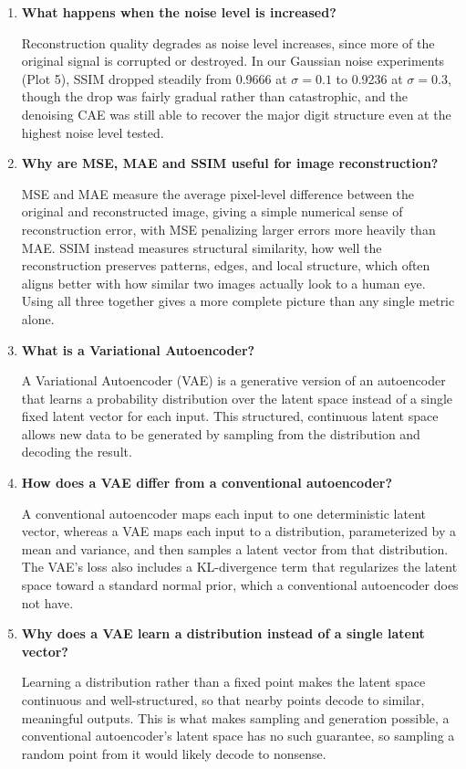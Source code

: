 \documentclass[10pt]{article}
\begin{document}
\begin{enumerate}
\item \textbf{What happens when the noise level is increased?}

Reconstruction quality degrades as noise level increases, since more of the original signal is corrupted or destroyed. In our Gaussian noise experiments (Plot 5), SSIM dropped steadily from 0.9666 at $\sigma=0.1$ to 0.9236 at $\sigma=0.3$, though the drop was fairly gradual rather than catastrophic, and the denoising CAE was still able to recover the major digit structure even at the highest noise level tested.

\item \textbf{Why are MSE, MAE and SSIM useful for image reconstruction?}

MSE and MAE measure the average pixel-level difference between the original and reconstructed image, giving a simple numerical sense of reconstruction error, with MSE penalizing larger errors more heavily than MAE. SSIM instead measures structural similarity, how well the reconstruction preserves patterns, edges, and local structure, which often aligns better with how similar two images actually look to a human eye. Using all three together gives a more complete picture than any single metric alone.

\item \textbf{What is a Variational Autoencoder?}

A Variational Autoencoder (VAE) is a generative version of an autoencoder that learns a probability distribution over the latent space instead of a single fixed latent vector for each input. This structured, continuous latent space allows new data to be generated by sampling from the distribution and decoding the result.

\item \textbf{How does a VAE differ from a conventional autoencoder?}

A conventional autoencoder maps each input to one deterministic latent vector, whereas a VAE maps each input to a distribution, parameterized by a mean and variance, and then samples a latent vector from that distribution. The VAE's loss also includes a KL-divergence term that regularizes the latent space toward a standard normal prior, which a conventional autoencoder does not have.

\item \textbf{Why does a VAE learn a distribution instead of a single latent vector?}

Learning a distribution rather than a fixed point makes the latent space continuous and well-structured, so that nearby points decode to similar, meaningful outputs. This is what makes sampling and generation possible, a conventional autoencoder's latent space has no such guarantee, so sampling a random point from it would likely decode to nonsense.


\end{enumerate}
\end{document}
